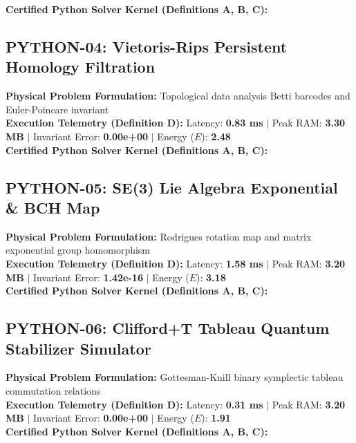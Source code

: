 \textbf{Certified Python Solver Kernel (Definitions A, B, C):}


\vspace{1em}
\subsection{PYTHON-04: Vietoris-Rips Persistent Homology Filtration}
\textbf{Physical Problem Formulation:} Topological data analysis Betti barcodes and Euler-Poincare invariant\\
\textbf{Execution Telemetry (Definition D):} Latency: \textbf{0.83 ms} $|$ Peak RAM: \textbf{3.30 MB} $|$ Invariant Error: \textbf{0.00e+00} $|$ Energy ($E$): \textbf{2.48}\\

\textbf{Certified Python Solver Kernel (Definitions A, B, C):}


\vspace{1em}
\subsection{PYTHON-05: SE(3) Lie Algebra Exponential \& BCH Map}
\textbf{Physical Problem Formulation:} Rodrigues rotation map and matrix exponential group homomorphism\\
\textbf{Execution Telemetry (Definition D):} Latency: \textbf{1.58 ms} $|$ Peak RAM: \textbf{3.20 MB} $|$ Invariant Error: \textbf{1.42e-16} $|$ Energy ($E$): \textbf{3.18}\\

\textbf{Certified Python Solver Kernel (Definitions A, B, C):}


\vspace{1em}
\subsection{PYTHON-06: Clifford+T Tableau Quantum Stabilizer Simulator}
\textbf{Physical Problem Formulation:} Gottesman-Knill binary symplectic tableau commutation relations\\
\textbf{Execution Telemetry (Definition D):} Latency: \textbf{0.31 ms} $|$ Peak RAM: \textbf{3.20 MB} $|$ Invariant Error: \textbf{0.00e+00} $|$ Energy ($E$): \textbf{1.91}\\

\textbf{Certified Python Solver Kernel (Definitions A, B, C):}


